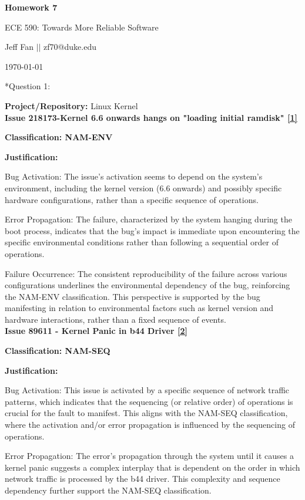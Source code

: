 \documentclass[12pt]{article}
\makeatletter
\numberwithin{table}{section}
\newcommand{\question}[2][]{\begin{flushleft}
		\Large\textbf{Question #1}: \large\textit{#2}
		
\end{flushleft}}
\newcommand{\maketitletwo}[2][]{\begin{center}
		\Large{\textbf{Homework #1}
			
			ECE 590: Towards More Reliable Software} %
		\vspace{5pt}
		
		\normalsize{Jeff Fan  \hspace{1em} $\left|\right|$ \hspace{1em}zf70@duke.edu  %
			
			\today}        %
		\vspace{15pt}
		
\end{center}}
\makeatother
\begin{document}
	\maketitletwo[7]  %
	
	\section*{Question 1: } 
	
	\textbf{{\large Project/Repository: }} Linux Kernel\\

	\textbf{Issue 218173-Kernel 6.6 onwards hangs on "loading initial ramdisk" \href{https://bugzilla.kernel.org/show_bug.cgi?id=218173}{[1]}}
	
	\textbf{Classification: NAM-ENV}
	
	\textbf{Justification:}
	
	Bug Activation: The issue's activation seems to depend on the system's environment, including the kernel version (6.6 onwards) and possibly specific hardware configurations, rather than a specific sequence of operations.
	
	Error Propagation: The failure, characterized by the system hanging during the boot process, indicates that the bug's impact is immediate upon encountering the specific environmental conditions rather than following a sequential order of operations.
	
	Failure Occurrence: The consistent reproducibility of the failure across various configurations underlines the environmental dependency of the bug, reinforcing the NAM-ENV classification. This perspective is supported by the bug manifesting in relation to environmental factors such as kernel version and hardware interactions, rather than a fixed sequence of events.\\
	
	\textbf{Issue 89611 - Kernel Panic in b44 Driver \href{https://bugzilla.kernel.org/show_bug.cgi?id=89611}{[2]}}
	
	\textbf{Classification: NAM-SEQ}
	
	\textbf{Justification:}
	
	Bug Activation: This issue is activated by a specific sequence of network traffic patterns, which indicates that the sequencing (or relative order) of operations is crucial for the fault to manifest. This aligns with the NAM-SEQ classification, where the activation and/or error propagation is influenced by the sequencing of operations.
	
	Error Propagation: The error's propagation through the system until it causes a kernel panic suggests a complex interplay that is dependent on the order in which network traffic is processed by the b44 driver. This complexity and sequence dependency further support the NAM-SEQ classification.
	
\end{document}
